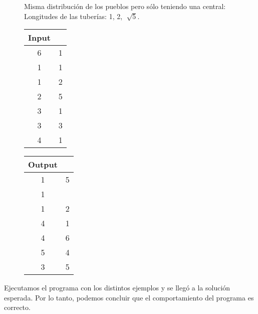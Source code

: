 \documentclass[11pt, a4paper, twoside]{article}
\begin{document}
\begin{figure}[H]
\begin{itemize}
	Misma distribución de los pueblos pero sólo teniendo una central: \\
	Longitudes de las tuberías: 1, 2, $\sqrt[] {5}$. \\
	   \begin{minipage}{0.2\textwidth}
			\begin{tabular}{cc}
			   Input \\
			   \hline
			   6 & 1 \\
			   1 & 1 \\
			   1 & 2 \\
			   2 & 5 \\
			   3 & 1 \\
			   3 & 3 \\
			   4 & 1 \\
			\end{tabular}
	   \end{minipage} 
	   \begin{minipage}{0.2\textwidth}
			\begin{tabular}{cc}
			   Output \\
			   \hline
			   1 & 5 \\
			   1 &   \\
			   1 & 2 \\
			   4 & 1 \\
			   4 & 6 \\
			   5 & 4 \\
			   3 & 5 \\
			\end{tabular}
	   \end{minipage} 
\end{itemize}
\end{figure}


Ejecutamos el programa con los distintos ejemplos y se llegó a la solución esperada. 
Por lo tanto, podemos concluir que el comportamiento del programa es correcto. 
\end{document}
